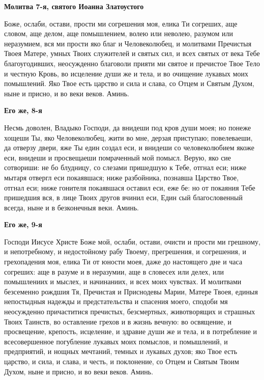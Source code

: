 \medskip
\bfseries Молитва 7-я, святого Иоанна Златоустого\normalfont{}\nopagebreak


Боже, ослаби, остави, прости ми согрешения моя, елика Ти согреших, аще словом, аще делом, аще помышлением, волею или неволею, разумом или неразумием, вся ми прости яко благ и Человеколюбец, и молитвами Пречистыя Твоея Матере, умных Твоих служителей и святых сил, и всех святых от века Тебе благоугодивших, неосужденно благоволи прияти ми святое и пречистое Твое Тело и честную Кровь, во исцеление души же и тела, и во очищение лукавых моих помышлений. Яко Твое есть царство и сила и слава, со Отцем и Святым Духом, ныне и присно, и во веки веков. Аминь.

\medskip
\bfseries Его же, 8-я\normalfont{}\nopagebreak


Несмь доволен, Владыко Господи, да внидеши под кров души моея; но понеже хощеши Ты, яко Человеколюбец, жити во мне, дерзая приступаю; повелеваеши, да отверзу двери, яже Ты един создал еси, и внидеши со человеколюбием якоже еси, внидеши и просвещаеши помраченный мой помысл. Верую, яко сие сотвориши: не бо блудницу, со слезами пришедшую к Тебе, отгнал еси; ниже мытаря отвергл еси покаявшася; ниже разбойника, познавша Царство Твое, отгнал еси; ниже гонителя покаявшася оставил еси, еже бе: но от покаяния Тебе пришедшия вся, в лице Твоих другов вчинил еси, Един сый благословенный всегда, ныне и в безконечныя веки. Аминь.

\medskip
\bfseries Его же, 9-я\normalfont{}\nopagebreak


Господи Иисусе Христе Боже мой, ослаби, остави, очисти и прости ми грешному, и непотребному, и недостойному рабу Твоему, прегрешения, и согрешения, и грехопадения моя, елика Ти от юности моея, даже до настоящего дне и часа согреших: аще в разуме и в неразумии, аще в словесех или делех, или помышлениих и мыслех, и начинаниих, и всех моих чувствах. И молитвами безсеменно рождшия Тя, Пречистая и Приснодевы Марии, Матере Твоея, единыя непостыдныя надежды и предстательства и спасения моего, сподоби мя неосужденно причаститися пречистых, безсмертных, животворящих и страшных Твоих Таинств, во оставление грехов и в жизнь вечную: во освящение, и просвещение, крепость, исцеление, и здравие души же и тела, и в потребление и всесовершенное погубление лукавых моих помыслов, и помышлений, и предприятий, и нощных мечтаний, темных и лукавых духов; яко Твое есть царство, и сила, и слава, и честь, и поклонение, со Отцем и Святым Твоим Духом, ныне и присно, и во веки веков. Аминь.


